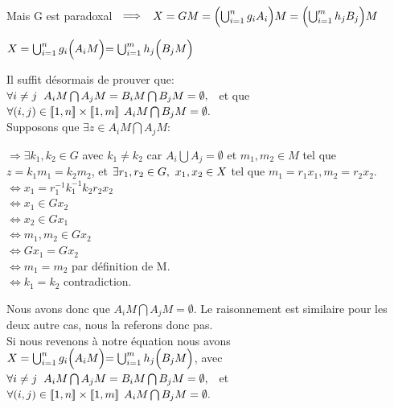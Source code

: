 \documentclass{article}
\begin{document}
Mais G est paradoxal $\hspace{0.2 cm } \Longrightarrow$
    $\hspace{0.2 cm }X = GM = \Bigl( \bigcup_{i=1}^ng_iA_i \Bigl)M = \Bigl(\bigcup_{i=1}^mh_jB_j\Bigl)M$\\
\begin{center}
   $ X =  \bigcup_{i=1}^ng_i\Bigl(A_i M\Bigl) = \bigcup_{i=1}^mh_j\Bigl(B_j M\Bigl)$
\end{center}

Il suffit désormais de prouver que:\\
$\forall i \neq j \hspace{0.2cm} A_iM \bigcap A_jM = B_iM \bigcap B_jM = \emptyset,\hspace{0.2cm}$ et que $\forall (i,j) \in [\![1,n]\!] \times [\![1,m]\!] \hspace{0.15cm} A_iM \bigcap B_jM = \emptyset. $\\

Supposons que $\exists z \in A_iM \bigcap A_jM$:
\begin{center}
    $\Longrightarrow \exists k_1, k_2 \in G$ avec $k_1 \neq k_2$ car $A_i \bigcup A_j = \emptyset$ et $m_1, m_2 \in M$ tel que $z = k_1m_1 = k_2m_2$, et $\exists r_1, r_2 \in G, \hspace{0.12cm} x_1,x_2 \in X$ tel que $m_1=r_1x_1, m_2=r_2x_2$.\\
    $\Leftrightarrow x_1=r_1^{-1}k_1^{-1}k_2r_2x_2$\\
    $\Leftrightarrow x_1 \in Gx_2$\\
    $\Leftrightarrow x_2 \in Gx_1$\\
    $\Leftrightarrow m_1, m_2 \in Gx_2$\\
    $\Leftrightarrow Gx_1 = Gx_2$\\
    $\Leftrightarrow m_1 = m_2$ par définition de M.\\
    $\Leftrightarrow k_1 = k_2$ contradiction.
\end{center}

Nous avons donc que $A_iM \bigcap A_jM = \emptyset.$
Le raisonnement est similaire pour les deux autre cas, nous la referons donc pas.\\

Si nous revenons à notre équation nous avons $X =  \bigcup_{i=1}^ng_i\Bigl(A_i M\Bigl) = \bigcup_{i=1}^mh_j\Bigl(B_j M\Bigl)$, avec $\forall i \neq j \hspace{0.2cm} A_iM \bigcap A_jM = B_iM \bigcap B_jM = \emptyset,\hspace{0.2cm}$ et $\forall (i,j) \in [\![1,n]\!] \times [\![1,m]\!] \hspace{0.15cm} A_iM \bigcap B_jM = \emptyset.$\\
\end{document}
